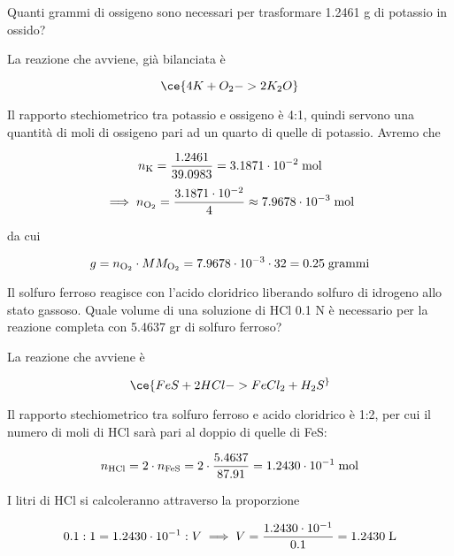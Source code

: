 \newpage

\begin{esercizio}
    Quanti grammi di ossigeno sono necessari per trasformare 1.2461 g di potassio in ossido?
\end{esercizio}
\begin{soluzione}
    La reazione che avviene, già bilanciata è

$$\ce{4K + O_2 -> 2K_2O}$$

Il rapporto stechiometrico tra potassio e ossigeno è 4:1, quindi servono una quantità di moli di ossigeno pari ad un quarto di quelle di potassio. Avremo che

$$n_{\rm K}=\frac{1.2461}{39.0983}=3.1871 \cdot 10^{-2} \; \rm mol$$
$$\implies n_{\rm O_2}
=\frac{3.1871 \cdot 10^{-2}}{4}
\approx 7.9678 \cdot 10^{-3} \; \rm mol$$

da cui

$$g=n_{\rm O_2} \cdot MM_{\rm O_2}
=7.9678 \cdot 10^{-3} \cdot 32=0.25 \; \rm grammi$$
\end{soluzione}

\newpage

\begin{esercizio}
    Il solfuro ferroso reagisce con l'acido cloridrico liberando solfuro di idrogeno allo stato gassoso. Quale volume di una soluzione di HCl 0.1 N è necessario per la reazione completa con 5.4637 gr di solfuro ferroso?
\end{esercizio}
\begin{soluzione}
    La reazione che avviene è

$$\ce{FeS + 2HCl -> FeCl_2 + H_2S ^}$$

Il rapporto stechiometrico tra solfuro ferroso e acido cloridrico è 1:2, per cui il numero di moli di HCl sarà pari al doppio di quelle di FeS:

$$n_{\rm HCl}=2 \cdot n_{\rm FeS}=2 \cdot \frac{5.4637}{87.91}=1.2430 \cdot 10^{-1} \; \rm mol$$

I litri di HCl si calcoleranno attraverso la proporzione

$$0.1:1=1.2430 \cdot 10^{-1}:V
\implies
V=\frac{1.2430 \cdot 10^{-1}}{0.1}=1.2430 \; \rm L$$
\end{soluzione}

\newpage

